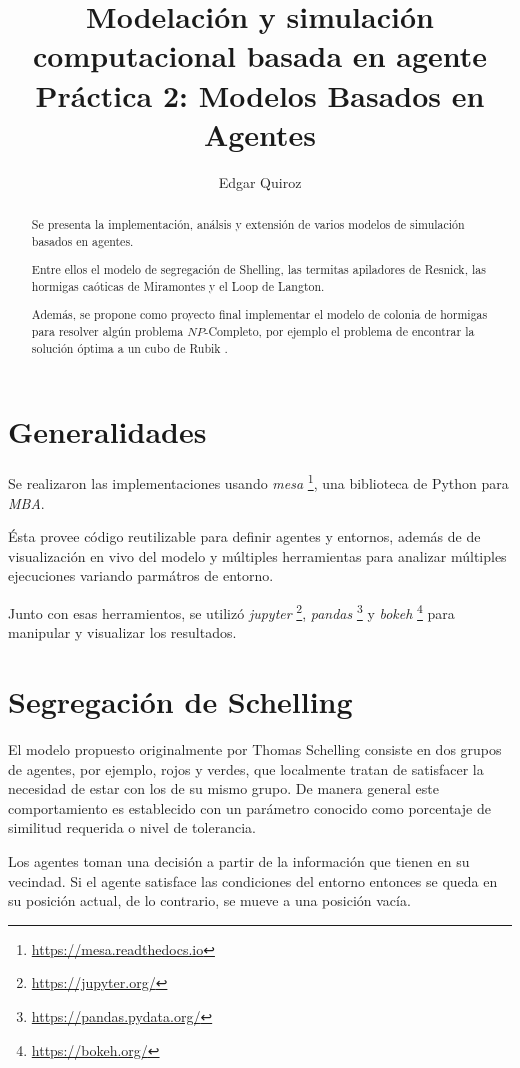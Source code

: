 \documentclass{article}
\title{
  Modelación y simulación computacional basada en agente\\
  Práctica 2: Modelos Basados en Agentes
}
\author{Edgar Quiroz}
\newcommand{\furl}[1]{\footnote{\url{#1}}}
\begin{document}
\maketitle

\begin{abstract}
  Se presenta la implementación, análsis y extensión de varios modelos de
  simulación basados en agentes.

  Entre ellos el modelo de segregación de Shelling\cite{Schelling_1971}, las
  termitas apiladores de Resnick\cite{10.5555/184223}, las hormigas caóticas de
  Miramontes\cite{Miramontes_1995} y el Loop de
  Langton\cite{langton84_self_reprod_cellul_autom}.

  Además, se propone como proyecto final implementar el modelo de colonia de
  hormigas \cite{Dorigo_1996} para resolver algún problema $NP$-Completo, por
  ejemplo el problema de encontrar la solución óptima a un cubo de Rubik
  \cite{Demaine_2018}.
\end{abstract}

\section{Generalidades}

Se realizaron las implementaciones usando \textit{mesa}
\furl{https://mesa.readthedocs.io}, una biblioteca de
Python para \textit{MBA}.

Ésta provee código reutilizable para definir agentes y entornos, además de de
visualización en vivo del modelo y múltiples herramientas para analizar
múltiples ejecuciones variando parmátros de entorno.

Junto con esas herramientos, se utilizó \textit{jupyter}
\furl{https://jupyter.org/}, \textit{pandas} \furl{https://pandas.pydata.org/} y
\textit{bokeh} \furl{https://bokeh.org/} para manipular y visualizar los
resultados.


\section{Segregación de Schelling}

El modelo propuesto originalmente por Thomas Schelling consiste en dos grupos
de agentes, por ejemplo, rojos y verdes, que localmente tratan de satisfacer la
necesidad de estar con los de su mismo grupo. De manera general este
comportamiento es establecido con un parámetro conocido como porcentaje de
similitud requerida o nivel de tolerancia.

Los agentes toman una decisión a partir de la información que tienen en su
vecindad. Si el agente satisface las condiciones del entorno entonces se queda
en su posición actual, de lo contrario, se mueve a una posición vacía.
\end{document}
